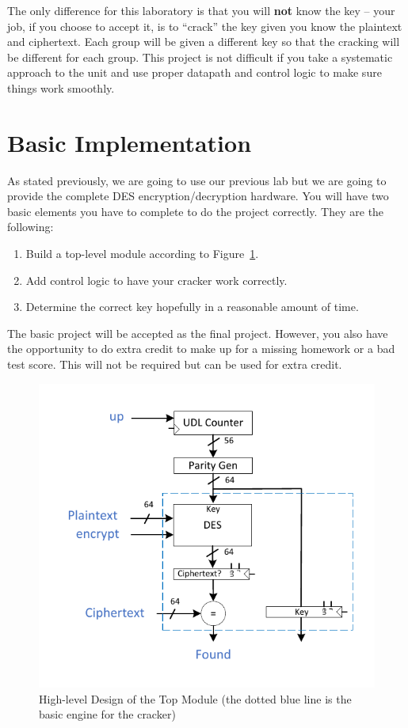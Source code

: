 \documentclass{article}
\begin{document}
The only difference
for this laboratory is that you will \textbf{not} know the key -- your job, if
you choose to accept it, is to ``crack'' the key given you know the
plaintext and ciphertext.  Each group will be given a different key so
that the cracking will be different for each group.  This project is
not difficult if you take a systematic approach to the unit and use
proper datapath and control logic to make sure things work smoothly.   

\section{Basic Implementation}

As stated previously, we are going to use our previous lab but we are
going to provide the complete DES encryption/decryption hardware.
You will have two basic
elements you have to complete to do the project correctly.  They are
the following:
\begin{enumerate}
\item Build a top-level module according to Figure~\ref{block2.fig}.
\item Add control logic to have your cracker work correctly.
\item Determine the correct key hopefully in a reasonable amount of time.
\end{enumerate}
The basic project will be accepted as the final project.  However, you
also have the opportunity to do extra credit to make up for a missing
homework or a bad test score.
This will not be required but can be used for extra credit.
\begin{figure} [t!]
  \centering
  \includegraphics[scale=1.2]{crack_des.pdf}
  \caption{High-level Design of the Top Module (the dotted blue line is the basic
  engine for the cracker)}
  \label{block2.fig}
\end{figure}
\end{document}
